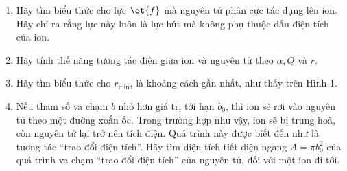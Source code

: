 \begin{vd}
\begin{enumerate}[1)]
\begin{center}
\\
Hình 2.
    \end{center}
    Với $p = 2aq$ và $r \ll a$.
    \item Hãy tìm biểu thức cho lực $\ot{f}$ mà nguyên tử phân cực tác dụng lên ion. Hãy chỉ ra rằng lực này luôn là lực hút mà không phụ thuộc dấu điện tích của ion.
    \item Hãy tính thế năng tương tác điện giữa ion và nguyên tử theo $\alpha, Q$ và $r$.
    \item Hãy tìm biểu thức cho $r_{\min}$, là khoảng cách gần nhất, như thấy trên Hình 1. 
    \item Nếu tham số va chạm $b$ nhỏ hơn giá trị tới hạn $b_{0}$, thì ion sẽ rơi vào nguyên tử theo một đường xoắn ốc. Trong trường hợp như vậy, ion sẽ bị trung hoà, còn nguyên tử lại trở nên tích điện. Quá trình này được biết đến như là tương tác ``trao đổi điện tích''. Hãy tìm diện tích tiết diện ngang $A = \pi b_{0}^{2}$ của quá trình va chạm ``trao đổi điện tích'' của nguyên tử, đối với một ion đi tới.
\end{enumerate}
\end{vd}
